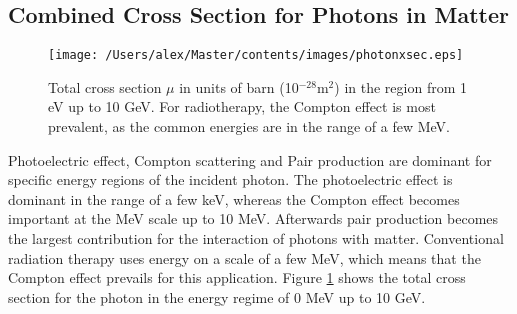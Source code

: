 \subsection{Combined Cross Section for Photons in Matter}
\begin{figure}[htp]
\centering
\texttt{[image: /Users/alex/Master/contents/images/photonxsec.eps]}
\caption{Total cross section $\mu$ in units of barn (10$^{-28}$m$^2$) in the region from 1 eV up to 10 GeV. For radiotherapy, the Compton effect is most prevalent, as the common energies are in the range of a few MeV.}
\label{fig:photonxsec}
\end{figure}
Photoelectric effect, Compton scattering and Pair production are dominant for specific energy regions of the incident photon. The photoelectric effect is dominant in the range of a few keV, whereas the Compton effect becomes important at the MeV scale up to 10 MeV. Afterwards pair production becomes the largest contribution for the interaction of photons with matter. Conventional radiation therapy uses energy on a scale of a few MeV, which means that the Compton effect prevails for this application. Figure \ref{fig:photonxsec} shows the total cross section for the photon in the energy regime of 0 MeV up to 10 GeV.
